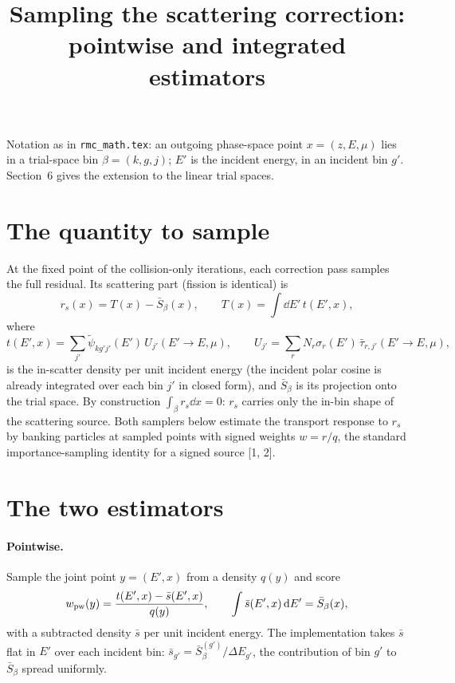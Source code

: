 \documentclass[11pt]{article}
\title{Sampling the scattering correction: pointwise and integrated estimators}
\date{}
\newcommand{\tpsi}{\tilde\psi}
\newcommand{\Sbar}{\bar S}
\begin{document}
\maketitle

\noindent Notation as in \texttt{rmc\_math.tex}: an outgoing phase-space point
$x=(z,E,\mu)$ lies in a trial-space bin $\beta=(k,g,j)$; $E'$ is the incident energy,
in an incident bin $g'$. Section~6 gives the extension to the linear trial spaces.

\section{The quantity to sample}

At the fixed point of the collision-only iterations, each correction pass samples the
full residual. Its scattering part (fission is identical) is
\begin{equation}
  r_s(x) = T(x) - \Sbar_\beta(x),\qquad
  T(x) = \int \dd E'\, t(E',x),
  \label{eq:rs}
\end{equation}
where
\begin{equation}
  t(E',x) = \sum_{j'} \tpsi_{kg'j'}(E')\, U_{j'}(E'\to E,\mu),\qquad
  U_{j'} = \sum_r N_r\sigma_r(E')\,\bar\tau_{r,j'}(E'\to E,\mu),
\end{equation}
is the in-scatter density per unit incident energy (the incident polar cosine is
already integrated over each bin $j'$ in closed form), and $\Sbar_\beta$ is its
projection onto the trial space. By construction $\int_\beta r_s\dd x = 0$: $r_s$
carries only the in-bin shape of the scattering source. Both samplers below estimate
the transport response to $r_s$ by banking particles at sampled points with signed
weights $w = r/q$, the standard importance-sampling identity for a signed source [1, 2].

\section{The two estimators}

\paragraph{Pointwise.} Sample the joint point $y=(E',x)$ from a density $q(y)$ and score
\begin{equation}
  w_{\rm pw}(y) = \frac{t(E',x) - \bar s(E',x)}{q(y)},
  \qquad \int \bar s(E',x)\dd E' = \Sbar_\beta(x),
  \label{eq:pointwise}
\end{equation}
with a subtracted density $\bar s$ per unit incident energy. The implementation takes
$\bar s$ flat in $E'$ over each incident bin:
$\bar s_{g'} = \Sbar^{(g')}_\beta/\Delta E_{g'}$, the contribution of bin $g'$ to
$\Sbar_\beta$ spread uniformly.
\end{document}

